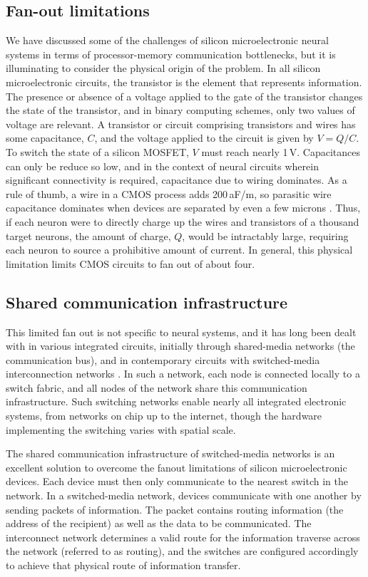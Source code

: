 \documentclass[twocolumn]{article}
\begin{document}
\subsection{Fan-out limitations}
We have discussed some of the challenges of silicon microelectronic neural systems in terms of processor-memory communication bottlenecks, but it is illuminating to consider the physical origin of the problem. In all silicon microelectronic circuits, the transistor is the element that represents information. The presence or absence of a voltage applied to the gate of the transistor changes the state of the transistor, and in binary computing schemes, only two values of voltage are relevant. A transistor or circuit comprising transistors and wires has some capacitance, $C$, and the voltage applied to the circuit is given by $V = Q/C$. To switch the state of a silicon MOSFET, $V$ must reach nearly 1\,V. Capacitances can only be reduce so low, and in the context of neural circuits wherein significant connectivity is required, capacitance due to wiring dominates. As a rule of thumb, a wire in a CMOS process adds 200\,aF/\textmu m, so parasitic wire capacitance dominates when devices are separated by even a few microns \cite{mi2017}. Thus, if each neuron were to directly charge up the wires and transistors of a thousand target neurons, the amount of charge, $Q$, would be intractably large, requiring each neuron to source a prohibitive amount of current. In general, this physical limitation limits CMOS circuits to fan out of about four. 

\subsection{Shared communication infrastructure}
This limited fan out is not specific to neural systems, and it has long been dealt with in various integrated circuits, initially through shared-media networks (the communication bus), and in contemporary circuits with switched-media interconnection networks \cite{hepa2012}. In such a network, each node is connected locally to a switch fabric, and all nodes of the network share this communication infrastructure. Such switching networks enable nearly all integrated electronic systems, from networks on chip up to the internet, though the hardware implementing the switching varies with spatial scale. 

The shared communication infrastructure of switched-media networks is an excellent solution to overcome the fanout limitations of silicon microelectronic devices. Each device must then only communicate to the nearest switch in the network. In a switched-media network, devices communicate with one another by sending packets of information. The packet contains routing information (the address of the recipient) as well as the data to be communicated. The interconnect network determines a valid route for the information traverse across the network (referred to as routing), and the switches are configured accordingly to achieve that physical route of information transfer.
\end{document}
